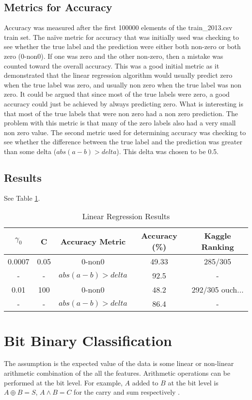 \documentclass[pdftex,a4paper,12pt]{article}
\begin{document}
\subsection{Metrics for Accuracy}
Accuracy was measured after the first 100000 elements of the train\_2013.csv train set. The na{\"i}ve metric for accuracy that was initially used was checking to see whether the true label and the prediction were either both non-zero or both zero (0-non0). If one was zero and the other non-zero, then a mistake was counted toward the overall accuracy. This was a good initial metric as it demonstrated that the linear regression algorithm would usually predict zero when the true label was zero, and usually non zero when the true label was non zero. It could be argued that since most of the true labels were zero, a good accuracy could just be achieved by always predicting zero. What is interesting is that most of the true labels that were non zero had a non zero prediction. The problem with this metric is that many of the zero labels also had a very small non zero value. The second metric used for determining accuracy was checking to see whether the difference between the true label and the prediction was greater than some delta ($abs(a - b) > delta$). This delta was chosen to be 0.5.
\subsection{Results}
See Table \ref{table:linAcc}.
  \begin{table}[h]
        {\centering
          \begin{tabular}{|c|c|c|c|c|}
            \hline
             $\gamma_0$ & C & Accuracy Metric & Accuracy (\%) & Kaggle Ranking\\
            \hline
                0.0007 &   0.05        & 0-non0 & 49.33 & 285/305 \\
             \hline
                - &   -        & $abs(a - b) > delta$ & 92.5 & - \\
                  \hline
                0.01 &  100         &  0-non0  & 48.2 & 292/305   ouch... \\
          \hline
                - &  -         & $abs(a - b) > delta$ & 86.4 & - \\
             \hline
          \end{tabular}
          \caption{Linear Regression Results}          
          \label{table:linAcc}}
  \end{table}
\section{Bit Binary Classification}

The assumption is the expected value of the data is some linear or non-linear arithmetic combination of the all the features.  Arithmetic operations can be performed at the bit level.  For example, $A$ added to $B$ at the bit level is $A \oplus B = S$, $A \land B = C$ for the carry and sum respectively \cite{lancaster2001excel}.  



\end{document}
